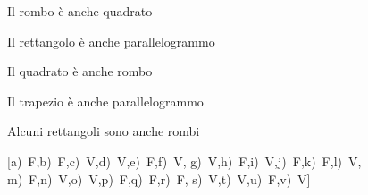 \begin{esercizio}
\begin{enumeratea}
\item Il rombo è anche quadrato\hfill\boxV\quad\boxF
\item Il rettangolo è anche parallelogrammo\hfill\boxV\quad\boxF
\item Il quadrato è anche rombo\hfill\boxV\quad\boxF
\item Il trapezio è anche parallelogrammo\hfill\boxV\quad\boxF
\item Alcuni rettangoli sono anche rombi\hfill\boxV\quad\boxF
\end{enumeratea}
\hfill[a)~F,\quad b)~F,\quad c)~V,\quad d)~V,\quad e)~F,\quad f)~V,\quad 
g)~V,\quad h)~F,\quad i)~V,\quad j)~F,\quad k)~F,\quad l)~V,\quad 
m)~F,\quad n)~V,\quad o)~V,\quad p)~F,\quad q)~F,\quad r)~F,\quad 
s)~V,\quad t)~V,\quad u)~F,\quad v)~V]
\end{esercizio}


